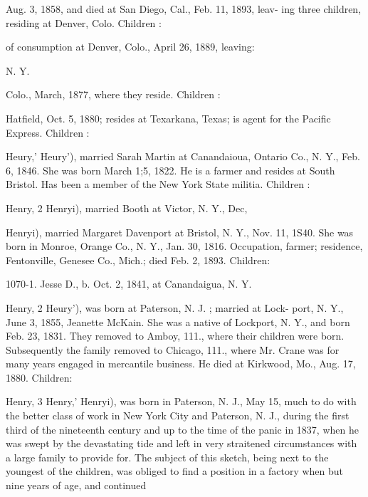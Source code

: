 \documentclass[oneside]{book}
\begin{document}
Aug. 3, 1858, and died at San Diego, Cal., Feb. 11, 1893, leav- 
ing three children, residing at Denver, Colo. Children : 





of consumption at Denver, Colo., April 26, 1889, leaving: 


N. Y. 



Colo., March, 1877, where they reside. Children : 






Hatfield, Oct. 5, 1880; resides at Texarkana, Texas; is agent 
for the Pacific Express. Children : 




Heury,' Heury'), married Sarah Martin at Canandaioua, Ontario 
Co., N. Y., Feb. 6, 1846. She was born March 1;5, 1822. He 
is a farmer and resides at South Bristol. Has been a member of 
the New York State militia. Children : 



Henry, 2 Henryi), married Booth at Victor, N. Y., Dec, 



Henryi), married Margaret Davenport at Bristol, N. Y., Nov. 
11, 1S40. She was born in Monroe, Orange Co., N. Y., Jan. 
30, 1816. Occupation, farmer; residence, Fentonville, Genesee 
Co., Mich.; died Feb. 2, 1893. Children: 

1070-1. Jesse D., b. Oct. 2, 1841, at Canandaigua, N. Y. 

Henry, 2 Heury'), was born at Paterson, N. J. ; married at Lock- 
port, N. Y., June 3, 1855, Jeanette McKain. She was a native 
of Lockport, N. Y., and born Feb. 23, 1831. They removed 
to Amboy, 111., where their children were born. Subsequently the 
family removed to Chicago, 111., where Mr. Crane was for many 
years engaged in mercantile business. He died at Kirkwood, 
Mo., Aug. 17, 1880. Children: 


Henry, 3 Henry,' Henryi), was born in Paterson, N. J., May 15, 
much to do with the better class of work in New York City and 
Paterson, N. J., during the first third of the nineteenth century 
and up to the time of the panic in 1837, when he was swept by 
the devastating tide and left in very straitened circumstances 
with a large family to provide for. The subject of this sketch, 
being next to the youngest of the children, was obliged to find a 
position in a factory when but nine years of age, and continued 
\end{document}
